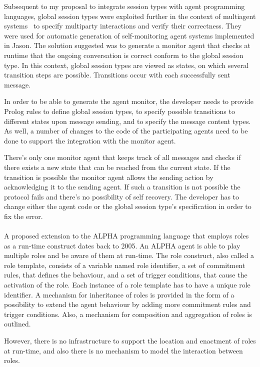\documentclass[a4paper,12pt,oneside,fleqn]{book} %
\begin{document}
Subsequent to my proposal to integrate session types with agent programming
languages, global session types were exploited further in the context of
multiagent systems~\cite{DBLP:conf/dalt/AnconaDM12} to specify multiparty
interactions and verify their correctness. They were used for automatic
generation of self-monitoring agent systems implemented in Jason. The
solution suggested was to generate a monitor agent that checks at runtime
that the ongoing conversation is correct conform to the global session
type. In this context, global session types are viewed as states, on which
several transition steps are possible. Transitions occur with each
successfully sent message.

In order to be able to generate the agent monitor, the developer needs to
provide Prolog rules to define global session types, to specify possible
transitions to different states upon message sending, and to specify the
message content types. As well, a number of changes to the code of the
participating agents need to be done to support the integration with the
monitor agent.

There's only one monitor agent that keeps track of all messages and checks
if there exists a new state that can be reached from the current state. If
the transition is possible the monitor agent allows the sending action by
acknowledging it to the sending agent. If such a transition is not
possible the protocol fails and there's no possibility of self recovery.
The developer has to change either the agent code or the global session
type's specification in order to fix the error.
\\~\\

A proposed extension to the ALPHA programming language that employs roles
as a run-time construct dates back to 2005\cite{Collier_arole-based}. An
ALPHA agent is able to play multiple roles and be aware of them at
run-time. The role construct, also called a role template, consists of a
variable named role identifier, a set of commitment rules, that defines the
behaviour, and a set of trigger conditions, that cause the activation of
the role. Each instance of a role template has to have a unique role
identifier. A mechanism for inheritance of roles is provided in the form of
a possibility to  extend the agent behaviour by adding more commitment
rules and trigger conditions.  Also, a mechanism for composition and
aggregation of roles is outlined.

However, there is no infrastructure to support the location and enactment
of roles at run-time, and also there is no mechanism to model the
interaction between roles. \\~\\
\end{document}
